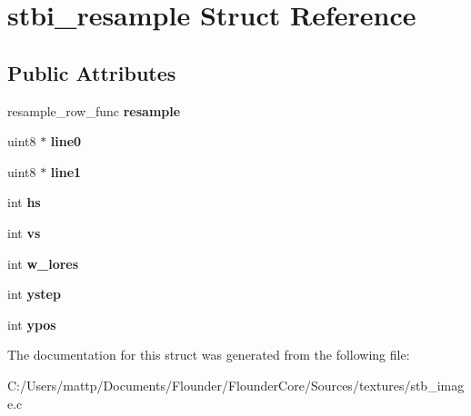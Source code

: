 \hypertarget{structstbi__resample}{}\section{stbi\+\_\+resample Struct Reference}
\label{structstbi__resample}
\subsection*{Public Attributes}
\begin{DoxyCompactItemize}
\item 
\mbox{\label{structstbi__resample_a94091463ebc5933cdaf7a813025b6e19}} 
resample\+\_\+row\+\_\+func {\bfseries resample}
\item 
\mbox{\label{structstbi__resample_a30c51395efffb663b183d7c64def6db3}} 
uint8 $\ast$ {\bfseries line0}
\item 
\mbox{\label{structstbi__resample_ac1165a6da3cf652b951056667f89b1f2}} 
uint8 $\ast$ {\bfseries line1}
\item 
\mbox{\label{structstbi__resample_a1513390ba0102364169a52ff26d5e0f2}} 
int {\bfseries hs}
\item 
\mbox{\label{structstbi__resample_a331c717f53239339c0c678f92a7bf4d5}} 
int {\bfseries vs}
\item 
\mbox{\label{structstbi__resample_a41d43c7b0d6caafbf0dfa8ef064bd2a2}} 
int {\bfseries w\+\_\+lores}
\item 
\mbox{\label{structstbi__resample_a0c479143447d103e73348c89f8b4ef1c}} 
int {\bfseries ystep}
\item 
\mbox{\label{structstbi__resample_aa1f1ad33e739f7a38fbad8752f64f983}} 
int {\bfseries ypos}
\end{DoxyCompactItemize}


The documentation for this struct was generated from the following file\+:\begin{DoxyCompactItemize}
\item 
C\+:/\+Users/mattp/\+Documents/\+Flounder/\+Flounder\+Core/\+Sources/textures/stb\+\_\+image.\+c\end{DoxyCompactItemize}
